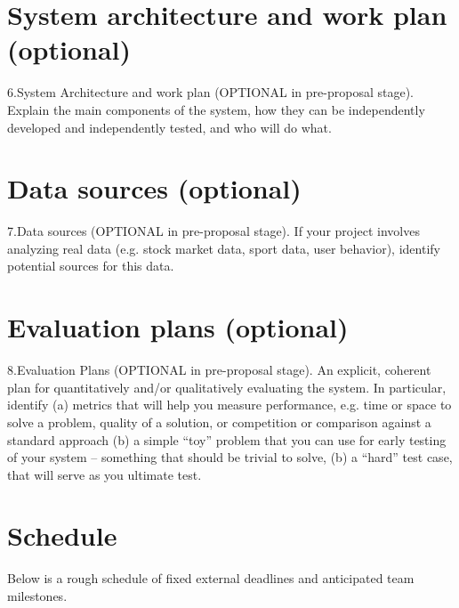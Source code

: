 \section{System architecture and work plan (optional)}


6.System Architecture and work plan (OPTIONAL in pre-proposal
stage). Explain the main components of the system, how they can be
independently developed and independently tested, and who will do
what.



\section{Data sources (optional)}


7.Data sources (OPTIONAL in pre-proposal stage). If your project
involves analyzing real data (e.g. stock market data, sport data, user
behavior), identify potential sources for this data.



\section{Evaluation plans (optional)}


8.Evaluation Plans (OPTIONAL in pre-proposal stage). An explicit,
coherent plan for quantitatively and/or qualitatively evaluating the
system. In particular, identify (a) metrics that will help you measure
performance, e.g. time or space to solve a problem, quality of a
solution, or competition or comparison against a standard approach (b)
a simple “toy” problem that you can use for early testing of your
system – something that should be trivial to solve, (b) a “hard” test
case, that will serve as you ultimate test.



\section{Schedule}

Below is a rough schedule of fixed external deadlines and anticipated
team milestones.

